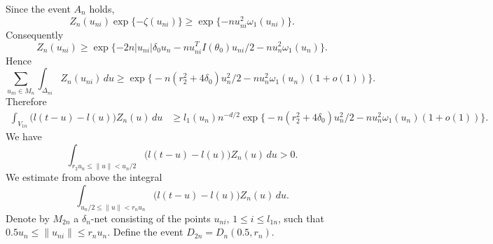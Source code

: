 \documentclass[11pt,a4paper]{article}
\begin{document}
Since the event $A_n$ holds,
\begin{equation}
Z_n(u_{ni})\exp\{-\zeta(u_{ni})\}\ge\exp\{-nu_{ni}^2\omega_1(u_{ni})\}.
\label{eq:109}
\end{equation}
Consequently
\begin{equation}
Z_n(u_{ni})\ge\exp\{-2n|u_{ni}|\delta_0 u_n-nu_{ni}^TI(\theta_0)u_{ni}/2-nu_n^2\omega_1(u_n)\}.
\label{eq:110}
\end{equation}
Hence
\begin{equation}
\sum_{u_{ni}\in M_n}\int_{\Delta_{ni}}Z_n(u_{ni})\,du\ge\exp\bigl\{-n(r_2^2+4\delta_0)u_n^2/2-nu_n^2\omega_1(u_n)(1+o(1))\bigr\}.
\label{eq:111}
\end{equation}
Therefore
\begin{align}
\int_{V_{1n}}\bigl(l(t-u)-l(u)\bigr)Z_n(u)\,du
&\ge l_1(u_n)n^{-d/2}\exp\bigl\{-n(r_2^2+4\delta_0)u_n^2/2-nu_n^2\omega_1(u_n)(1+o(1))\bigr\}.
\label{eq:112}
\end{align}
We have
\begin{equation}
\int_{r_2u_n\le\|u\|<u_n/2}\bigl(l(t-u)-l(u)\bigr)Z_n(u)\,du>0.
\label{eq:113}
\end{equation}
We estimate from above the integral
\begin{equation}
\int_{u_n/2\le\|u\|<r_nu_n}\bigl(l(t-u)-l(u)\bigr)Z_n(u)\,du.
\label{eq:114}
\end{equation}
Denote by $M_{2n}$ a $\delta_n$-net consisting of the points $u_{ni}$, $1\le i\le l_{1n}$, such that $0.5u_n\le\|u_{ni}\|\le r_nu_n$. Define the event $D_{2n}=D_n(0.5,r_n)$.
\end{document}
